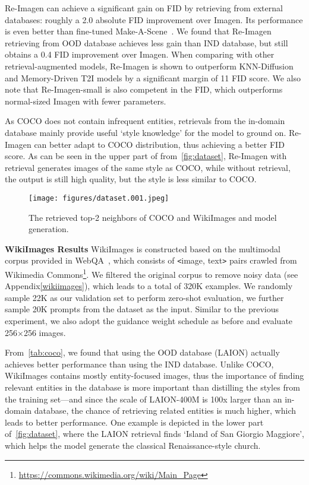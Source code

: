 \documentclass{article} \usepackage{iclr2023_conference,times}
\newcommand{\modelname}{{Re-Imagen}\xspace}
\begin{document}
\modelname can achieve a significant gain on FID by retrieving from external databases: roughly a 2.0 absolute FID improvement over Imagen. Its performance is even better than fine-tuned Make-A-Scene~\citep{gafni2022make}. We found that \modelname retrieving from OOD database achieves less gain than IND database, but still obtains a 0.4 FID improvement over Imagen. When comparing with other retrieval-augmented models, \modelname is shown to outperform KNN-Diffusion and Memory-Driven T2I models by a significant margin of 11 FID score. We also note that \modelname-small is also competent in the FID, which outperforms normal-sized Imagen with fewer parameters.

As COCO does not contain infrequent entities, retrievals from the in-domain database mainly provide useful `style knowledge' for the model to ground on. \modelname can better adapt to COCO distribution, thus achieving a better FID score. As can be seen in the upper part of from~\autoref{fig:dataset}, \modelname with retrieval generates images of the same style as COCO, while without retrieval, the output is still high quality, but the style is less similar to COCO.
\begin{figure}[!t]
    \centering
    \texttt{[image: figures/dataset.001.jpeg]}
    \caption{{The retrieved top-2 neighbors of COCO and WikiImages and model generation.}}
    \label{fig:dataset}
    \vspace{-2ex}
\end{figure}

\noindent\textbf{WikiImages Results}
WikiImages is constructed based on the multimodal corpus provided in Web\-QA~\citep{chang2022webqa}, which consists of \texttt{<}image, text\texttt{>} pairs crawled from Wikimedia Commons\footnote{\url{https://commons.wikimedia.org/wiki/Main_Page}}. We filtered the original corpus to remove noisy data (see Appendix\ref{wikiimages}), which leads to a total of 320K examples. We randomly sample 22K as our validation set to perform zero-shot evaluation, we further sample 20K prompts from the dataset as the input. Similar to the previous experiment, we also adopt the guidance weight schedule as before and evaluate 256$\times$256 images.

From~\autoref{tab:coco}, we found that using the OOD database (LAION) actually achieves better performance than using the IND database. Unlike COCO, WikiImages contains mostly entity-focused images, thus the importance of finding relevant entities in the database is more important than distilling the styles from the training set---and since the scale of LAION-400M is 100x larger than an in-domain database, the chance of retrieving related entities is much higher, which leads to better performance. One example is depicted in the lower part of~\autoref{fig:dataset}, where the LAION retrieval finds `Island of San Giorgio Maggiore', which helps the model generate the classical Renaissance-style church. 
\end{document}
